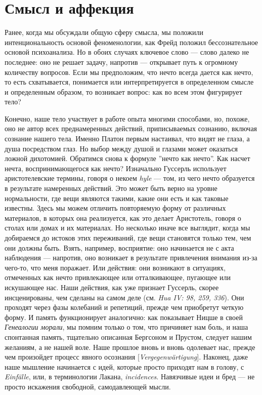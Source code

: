 \documentclass[12pt]{book}
\begin{document}
\section{Смысл и аффекция}

Ранее, когда мы обсуждали общую сферу смысла, мы положили интенциональность основой феноменологии, как Фрейд положил бессознательное основой психоанализа. Но в обоих случаях ключевое слово --- слово далеко не последнее: оно не решает задачу, напротив --- открывает путь к огромному количеству вопросов. Если мы предположим, что нечто всегда дается как нечто, то есть схватывается, понимается или интерпретируется в определенном смысле и определенным образом, то возникает вопрос: как во всем этом фигурирует тело?

Конечно, наше тело участвует в работе опыта многими способами, но, похоже, оно не автор всех преднамеренных действий, приписываемых сознанию, включая сознание нашего тела. Именно Платон первым настаивал, что видят не глаза, а душа посредством глаз. Но выбор между душой и глазами может оказаться ложной дихотомией. Обратимся снова к формуле ''нечто как нечто''. Как насчет нечта, воспринимающегося как нечто? Изначально Гуссерль использует аристотелевские термины, говоря о некоем \textit{hyle} --- том, из чего нечто образуется в результате намеренных действий. Это может быть верно на уровне нормальности, где вещи являются такими, какие они есть и как таковые известны. Здесь мы можем отличить повторяемую форму от различных материалов, в которых она реализуется, как это делает Аристотель, говоря о столах или домах и их материалах. Но несколько иначе все выглядит, когда мы добираемся до истоков этих переживаний, где вещи становятся только тем, чем они должны быть. Взять, например, восприятие: оно начинается не с акта наблюдения --- напротив, оно возникает в результате привлечения внимания из-за чего-то, что меня поражает. Или действия: они возникают в ситуациях, отмеченных как нечто привлекающее или отталкивающее, пугающее или искушающее нас. Наши действия, как уже признает Гуссерль, скорее инсценированы, чем сделаны на самом деле (см. \textit{Hua IV: 98, 259, 336}). Они проходят через фазы колебаний и репетиций, прежде чем приобретут четкую форму. И память функционирует аналогично: как показывает Ницше в своей \textit{Генеалогии морали}, мы помним только о том, что причиняет нам боль, и наша спонтанная память, тщательно описанная Бергсоном и Прустом, следует нашим желаниям, а не нашей воле. Наше прошлое вновь и вновь одолевает нас, прежде чем произойдет процесс явного осознания [\textit{Vergegenwärtigung}]. Наконец, даже наше мышление начинается с идей, которые просто приходят нам в голову, с \textit{Einfälle}, или, в терминологии Лакана, \textit{incidences}. Навязчивые идеи и бред --- не просто искажения свободной, самодавлеющей мысли.
\end{document}
